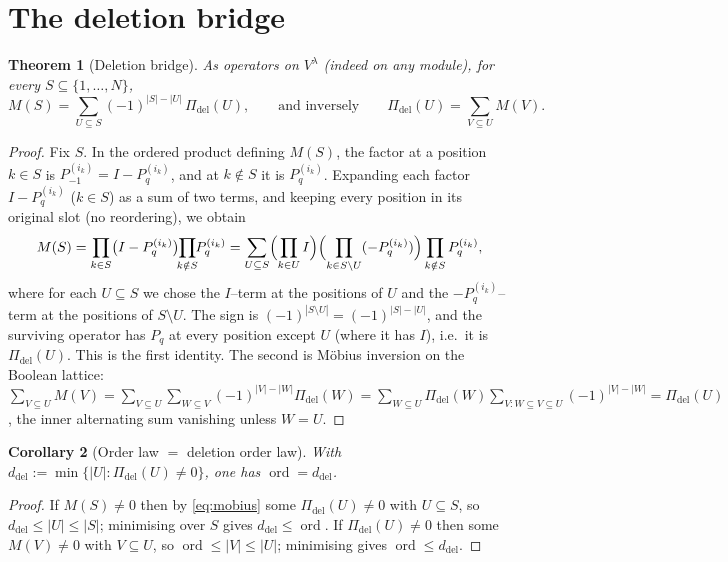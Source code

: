 \documentclass[11pt]{article}
\newtheorem{theorem}{Theorem}
\newtheorem{corollary}[theorem]{Corollary}
\theoremstyle{definition}
\DeclareMathOperator{\ord}{ord}
\newcommand{\Vlam}{V^\lambda}
\newcommand{\Pq}{P_{q}}
\newcommand{\Pm}{P_{-1}}
\newcommand{\Pdel}{\Pi_{\mathrm{del}}}
\newcommand{\ddel}{d_{\mathrm{del}}}
\begin{document}
\section{The deletion bridge}\label{sec:bridge}

\begin{theorem}[Deletion bridge]\label{thm:bridge}
As operators on $\Vlam$ (indeed on any module), for every $S\subseteq\{1,\dots,N\}$,
\begin{equation}\label{eq:mobius}
   M(S)=\sum_{U\subseteq S}(-1)^{|S|-|U|}\,\Pdel(U),\qquad\text{and inversely}\qquad
   \Pdel(U)=\sum_{V\subseteq U}M(V).
\end{equation}
\end{theorem}

\begin{proof}
Fix $S$. In the ordered product defining $M(S)$, the factor at a position $k\in S$ is
$\Pm^{(i_k)}=I-\Pq^{(i_k)}$, and at $k\notin S$ it is $\Pq^{(i_k)}$. Expanding each factor
$I-\Pq^{(i_k)}$ ($k\in S$) as a sum of two terms, and keeping every position in its original
slot (no reordering), we obtain
\[
   M(S)=\prod_{k\in S}\bigl(I-\Pq^{(i_k)}\bigr)\!\!\prod_{k\notin S}\!\!\Pq^{(i_k)}
       =\sum_{U\subseteq S}\Bigl(\prod_{k\in U}I\Bigr)\Bigl(\prod_{k\in S\setminus U}(-\Pq^{(i_k)})\Bigr)
        \prod_{k\notin S}\Pq^{(i_k)} ,
\]
where for each $U\subseteq S$ we chose the $I$--term at the positions of $U$ and the
$-\Pq^{(i_k)}$--term at the positions of $S\setminus U$. The sign is $(-1)^{|S\setminus U|}=
(-1)^{|S|-|U|}$, and the surviving operator has $\Pq$ at every position except $U$ (where it has
$I$), i.e.\ it is $\Pdel(U)$. This is the first identity. The second is Möbius inversion on the
Boolean lattice: $\sum_{V\subseteq U}M(V)=\sum_{V\subseteq U}\sum_{W\subseteq V}(-1)^{|V|-|W|}
\Pdel(W)=\sum_{W\subseteq U}\Pdel(W)\sum_{V:W\subseteq V\subseteq U}(-1)^{|V|-|W|}
=\Pdel(U)$, the inner alternating sum vanishing unless $W=U$.
\end{proof}

\begin{corollary}[Order law $=$ deletion order law]\label{cor:ord}
With $\ddel:=\min\{|U|:\Pdel(U)\neq0\}$, one has $\ord=\ddel$.
\end{corollary}

\begin{proof}
If $M(S)\neq0$ then by \eqref{eq:mobius} some $\Pdel(U)\neq0$ with $U\subseteq S$, so
$\ddel\le|U|\le|S|$; minimising over $S$ gives $\ddel\le\ord$. If $\Pdel(U)\neq0$ then some
$M(V)\neq0$ with $V\subseteq U$, so $\ord\le|V|\le|U|$; minimising gives $\ord\le\ddel$.
\end{proof}
\end{document}
